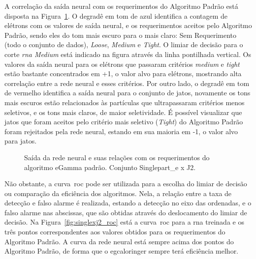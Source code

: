 A correlação da saída neural com os requerimentos do Algoritmo Padrão está
disposta na Figura~\ref{fig:singlexj2_saidaneural}. O degradê em tom de azul
identifica a contagem de elétrons com os valores de saída neural, e os
requerimentos aceitos pelo Algoritmo Padrão, sendo eles do tom mais escuro para
o mais claro: Sem Requerimento (todo o conjunto de dados), \emph{Loose},
\emph{Medium} e \emph{Tight}. O limiar de decisão para o corte \emph{\gls{rna}
Medium} está indicado na figura através da linha pontilhada vertical. Os valores
da saída neural para os elétrons que passaram critérios \emph{medium} e
\emph{tight} estão bastante concentrados em +1, o valor alvo para elétrons,
mostrando alta correlação entre a rede neural e esses critérios. Por outro lado,
o degradê em tom de vermelho identifica a saída neural para o conjunto de jatos,
novamente os tons mais escuros estão relacionados às partículas que
ultrapassaram critérios menos seletivos, e os tons mais claros, de maior
seletividade. É possível visualizar que jatos que foram aceitos pelo critério
mais seletivo (\emph{Tight}) do Algoritmo Padrão foram rejeitados pela rede neural, 
estando em sua maioria em -1, o valor alvo para jatos.

\begin{figure}[htb]
\centering
{}
\caption{Saída da rede neural e suas relações com os requerimentos do algoritmo
eGamma padrão. Conjunto Singlepart\_e x J2.}
\label{fig:singlexj2_saidaneural}
\end{figure}

Não obstante, a curva~\gls{roc} pode ser utilizada para a escolha do limiar de
decisão ou comparação da eficiência dos algoritmos. Nela, a relação entre a taxa
de detecção e falso alarme é realizada, estando a detecção no eixo das
ordenadas, e o falso alarme nas abscissas, que são obtidas através do
deslocamento do limiar de decisão. Na Figura~\ref{fig:singlexj2_roc} está a
curva~\gls{roc} para a \gls{rna} treinada e os três pontos correspondentes aos
valores obtidos para os requerimentos do Algoritmo Padrão. A curva da rede
neural está sempre acima dos pontos do Algoritmo Padrão, de forma que o
\gls{egcaloringer} sempre terá eficiência melhor.

